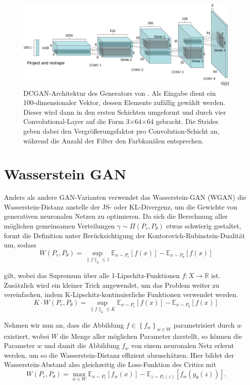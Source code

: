 \documentclass{hsflensburg}
\begin{document}
  \begin{figure}
    \includegraphics[width=\textwidth]{images/dcgan-architecture}
    \caption{DCGAN-Architektur des Generators von
    \cite{radford2016unsupervised}. Als Eingabe dient ein 100-dimensionaler
    Vektor, dessen Elemente zufällig gewählt werden. Dieser wird dann in den
    ersten Schichten umgeformt und durch vier Convolutional-Layer auf die Form
    3$\times$64$\times$64 gebracht. Die Strides geben dabei den
    Vergrößerungsfaktor pro Convolution-Schicht an, während die Anzahl der
    Filter den Farbkanälen entsprechen.}
  \end{figure}

  \section{Wasserstein GAN}
  Anders als andere GAN-Varianten verwendet das Wasserstein-GAN (WGAN) die
  Was\-ser\-stein-Distanz anstelle der JS- oder KL-Divergenz, um die Gewichte
  von generativen neuronalen Netzen zu optimieren. Da sich die Berechnung aller
  möglichen gemeinsamen Verteilungen $\gamma \sim \Pi(P_r, P_\theta)$ etwas schwierig
  gestaltet, formt \cite{arjovsky2017wasserstein} die Definition unter
  Berücksichtigung der Kontorovich-Rubinstein-Dualität um, sodass
  \[
    W(P_r, P_\theta) = \sup_{\|f\|_L \leq 1} \mathbb{E}_{x \sim P_r}\left[f(x)\right] - \mathbb{E}_{x \sim P_\theta}\left[f(x)\right]
  \]

  gilt, wobei das Supremum über alle 1-Lipschitz-Funktionen $f : X \to
  \mathbb{R}$ ist. Zusätzlich wird ein kleiner Trick angewendet, um das Problem
  weiter zu vereinfachen, indem K-Lipschitz-kontinuierliche Funktionen verwendet
  werden.
  \[
    K \cdot W(P_r, P_\theta) = \sup_{\|f\|_L \leq K} \mathbb{E}_{x \sim P_r}\left[f(x)\right] - \mathbb{E}_{x \sim P_\theta}\left[f(x)\right]
  \]

  Nehmen wir nun an, dass die Abbildung $f \in \left\{f_w\right\}_{w \in W}$
  parametrisiert durch $w$ existiert, wobei $W$ die Menge aller möglichen
  Parameter darstellt, so können die Parameter $w$ und damit die Abbildung $f_w$
  von einem neuronalen Netz erlernt werden, um so die Wasserstein-Distanz
  effizient abzuschätzen. Hier bildet der Wasserstein-Abstand also gleichzeitig
  die Loss-Funktion des Critics mit
  \[
    W(P_r, P_\theta) = \max_{w \in W} \mathbb{E}_{x \sim P_r}\left[f_w(x)\right]
    - \mathbb{E}_{z \sim P_r(z)}\left[f_w(g_\theta(z))\right].
  \]
\end{document}
